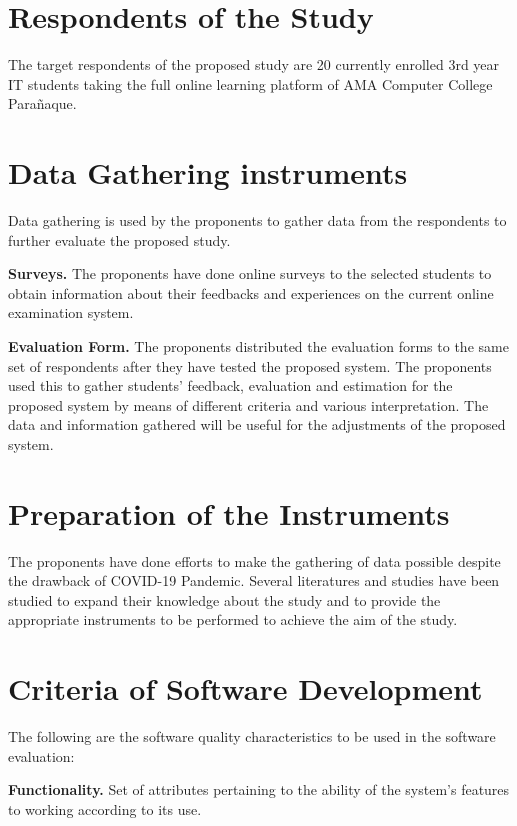 \section{Respondents of the Study}

The target respondents of the proposed study are 20 currently enrolled 3rd year IT students taking the full online learning platform of AMA Computer College Parañaque.

\section{Data Gathering instruments}

Data gathering is used by the proponents to gather data from the respondents to further evaluate the proposed study.

\textbf{Surveys.}
The proponents have done online surveys to the selected students to obtain information about their feedbacks and experiences on the current online examination system.

\textbf{Evaluation Form.}
The proponents distributed the evaluation forms to the same set of respondents after they have tested the proposed system.
The proponents used this to gather students’ feedback, evaluation and estimation for the proposed system by means of different criteria and various interpretation.
The data and information gathered will be useful for the adjustments of the proposed system.

\section{Preparation of the Instruments}

The proponents have done efforts to make the gathering of data possible despite the drawback of COVID-19 Pandemic.
Several literatures and studies have been studied to expand their knowledge about the study and to provide the appropriate instruments to be performed to achieve the aim of the study.

\section{Criteria of Software Development}

The following are the software quality characteristics to be used in the software evaluation:

\textbf{Functionality.}
Set of attributes pertaining to the ability of the system’s features to working according to its use.

